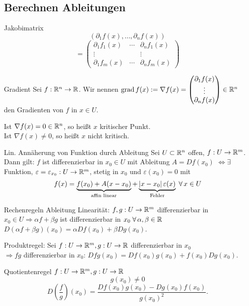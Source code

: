 \documentclass[main.tex]{subfiles}
\begin{document}
\subsection*{Berechnen Ableitungen}

\begin{karte}{Jakobimatrix}
    \[ (\partial_1f(x), \dots, \partial_n f(x)) \]
    \[ = \begin{pmatrix}
        \partial_1 f_1(x) & \cdots & \partial_n f_1(x) \\
        \vdots & & \vdots \\
        \partial_1 f_m(x) & \cdots & \partial_n f_m(x)
    \end{pmatrix} \]
\end{karte}

\begin{karte}{Gradient}
    Sei \( f : \mathbb{R}^n \rightarrow \mathbb{R} \).
    Wir nennen \( \operatorname{grad} f(x) := \nabla f(x) = \begin{pmatrix}
        \partial_1 f(x) \\
        \vdots \\
        \partial_n f(x)
    \end{pmatrix} \in \mathbb{R}^n \) den Gradienten von \(f\) in 
    \( x \in U \).

    Ist \( \nabla f(x) = 0 \in \mathbb{R}^n \), so heißt \(x\) 
    kritischer Punkt.\\
    Ist \( \nabla f(x) \neq 0 \), so heißt \(x\) 
    nicht kritisch.
\end{karte}

\begin{karte}{Lin. Annäherung von Funktion durch Ableitung}
    Sei \( U \subset \mathbb{R}^n\) offen, \(f : U \rightarrow \mathbb{R}^m\).
    Dann gilt:
    \(f\) ist differenzierbar in \(x_0 \in U \) mit Ableitung
    \( A = Df(x_0) \)
    \( \Leftrightarrow \exists \) Funktion, \( \varepsilon = 
    \varepsilon_{x_0} : U \rightarrow \mathbb{R}^m \), stetig in \(x_0\) und
    \(\varepsilon(x_0) = 0\) mit 
    \[ f(x) = \underbrace{f(x_0) + A(x-x_0)}_{\text{affin linear}} 
    + \underbrace{\abs{x-x_0}\varepsilon(x)}_{\text{Fehler}}
    \; \forall x \in U \]
\end{karte}

\begin{karte}{Rechenregeln Ableitung}
    Linearität: \( f,g : U \rightarrow \mathbb{R}^m \) differenzierbar in 
    \(x_0 \in U \Rightarrow \alpha f + \beta g \) ist differenzierbar 
    in \(x_0 \; \forall \alpha, \beta \in \R\) \\
    \( D(\alpha f + \beta g)(x_0) = \alpha Df(x_0) + \beta Dg(x_0) \).

    Produktregel: Sei \( f : U \rightarrow \mathbb{R}^m, g : U \rightarrow \mathbb{R} \)
    differenzierbar in \(x_0\) \\
    \( \Rightarrow  fg \) differenzierbar in \(x_0\): 
    \( Dfg(x_0) = Df(x_0)g(x_0) + f(x_0)Dg(x_0) \).

    Quotientenregel \( f : U \rightarrow \mathbb{R}^m, g : U \rightarrow \mathbb{R} \)
    \[ g(x_0) \neq 0 \]
    \[ D\left(\frac{f}{g}\right)(x_0) 
    = \frac{Df(x_0) g(x_0) - Dg(x_0) f(x_0)}{g(x_0)^2}. \]
\end{karte}
\end{document}
